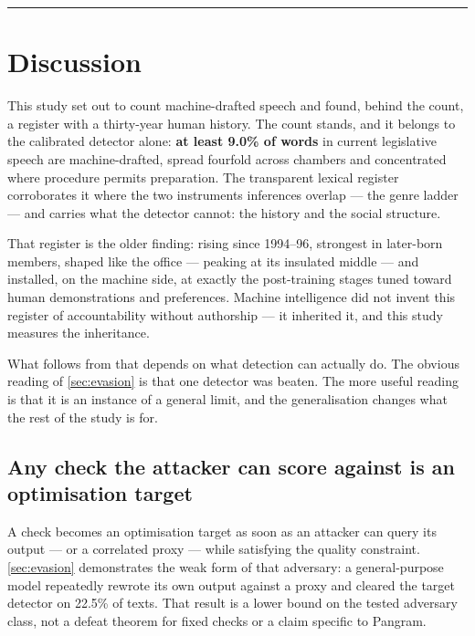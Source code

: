 \begin{center}\rule{0.5\linewidth}{0.5pt}\end{center}

\section{Discussion}\label{sec:discussion}

This study set out to count machine-drafted speech and found, behind the count, a register with a thirty-year human history. The count stands, and it belongs to the calibrated detector alone: \textbf{at least 9.0\% of words} in current legislative speech are machine-drafted, spread fourfold across chambers and concentrated where procedure permits preparation. The transparent lexical register corroborates it where the two instruments\textquotesingle{} inferences overlap --- the genre ladder --- and carries what the detector cannot: the history and the social structure.

That register is the older finding: rising since 1994--96, strongest in later-born members, shaped like the office --- peaking at its insulated middle --- and installed, on the machine side, at exactly the post-training stages tuned toward human demonstrations and preferences. Machine intelligence did not invent this register of accountability without authorship --- it inherited it, and this study measures the inheritance.

What follows from that depends on what detection can actually do. The
obvious reading of \cref{sec:evasion} is that one detector was beaten. The more useful
reading is that it is an instance of a general limit, and the generalisation
changes what the rest of the study is for.

\subsection{Any check the attacker can score against is an optimisation target}\label{sec:disc-limit}

A check becomes an optimisation target as soon as an attacker can query its output --- or a correlated proxy --- while satisfying the quality constraint. \cref{sec:evasion} demonstrates the weak form of that adversary: a general-purpose model repeatedly rewrote its own output against a proxy and cleared the target detector on 22.5\% of texts. That result is a lower bound on the tested adversary class, not a defeat theorem for fixed checks or a claim specific to Pangram.

